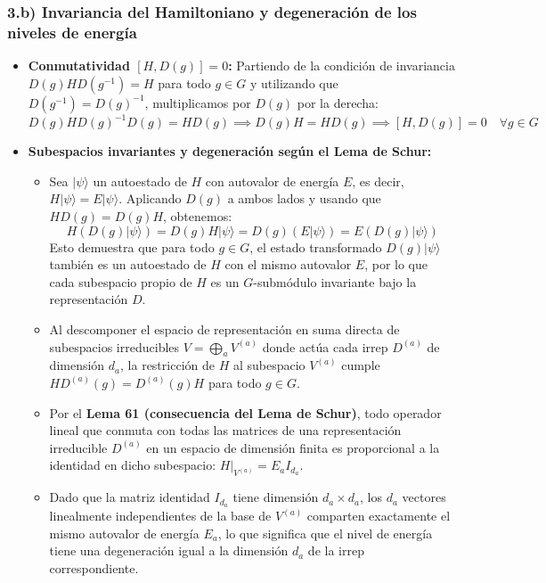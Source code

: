 \documentclass[11pt, a4paper]{article}
\begin{document}
\subsubsection*{3.b) Invariancia del Hamiltoniano y degeneración de los niveles de energía}
\begin{itemize}
    \item \textbf{Conmutatividad $[H, D(g)] = 0$:}
    Partiendo de la condición de invariancia $D(g) H D(g^{-1}) = H$ para todo $g \in G$ y utilizando que $D(g^{-1}) = D(g)^{-1}$, multiplicamos por $D(g)$ por la derecha:
    \[
    D(g) H D(g)^{-1} D(g) = H D(g) \implies D(g) H = H D(g) \implies [H, D(g)] = 0 \quad \forall g \in G
    \]
    \item \textbf{Subespacios invariantes y degeneración según el Lema de Schur:}
    \begin{itemize}
        \item Sea $|\psi\rangle$ un autoestado de $H$ con autovalor de energía $E$, es decir, $H |\psi\rangle = E |\psi\rangle$. Aplicando $D(g)$ a ambos lados y usando que $H D(g) = D(g) H$, obtenemos:
        \[
        H \left(D(g) |\psi\rangle\right) = D(g) H |\psi\rangle = D(g) (E |\psi\rangle) = E \left(D(g) |\psi\rangle\right)
        \]
        Esto demuestra que para todo $g \in G$, el estado transformado $D(g) |\psi\rangle$ también es un autoestado de $H$ con el mismo autovalor $E$, por lo que cada subespacio propio de $H$ es un $G$-submódulo invariante bajo la representación $D$.
        \item Al descomponer el espacio de representación en suma directa de subespacios irreducibles $V = \bigoplus_a V^{(a)}$ donde actúa cada irrep $D^{(a)}$ de dimensión $d_a$, la restricción de $H$ al subespacio $V^{(a)}$ cumple $H D^{(a)}(g) = D^{(a)}(g) H$ para todo $g \in G$.
        \item Por el \textbf{Lema 61 (consecuencia del Lema de Schur)}, todo operador lineal que conmuta con todas las matrices de una representación irreducible $D^{(a)}$ en un espacio de dimensión finita es proporcional a la identidad en dicho subespacio: $\left. H \right|_{V^{(a)}} = E_a I_{d_a}$.
        \item Dado que la matriz identidad $I_{d_a}$ tiene dimensión $d_a \times d_a$, los $d_a$ vectores linealmente independientes de la base de $V^{(a)}$ comparten exactamente el mismo autovalor de energía $E_a$, lo que significa que el nivel de energía tiene una degeneración igual a la dimensión $d_a$ de la irrep correspondiente.
    \end{itemize}
\end{itemize}
\end{document}
